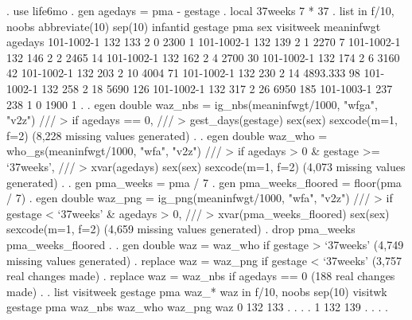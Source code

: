 . use life6mo
{\smallskip}
. gen agedays = pma - gestage
{\smallskip}
. local 37weeks 7 * 37
{\smallskip}
. list in f/10, noobs abbreviate(10) sep(10)
{\smallskip}
  {\TLC}
  {\VBAR}   infantid   gestage   pma   sex   visitweek   meaninfwgt   agedays {\VBAR}
  {\LFTT}
  {\VBAR} 101-1002-1       132   133     2           0         2300         1 {\VBAR}
  {\VBAR} 101-1002-1       132   139     2           1         2270         7 {\VBAR}
  {\VBAR} 101-1002-1       132   146     2           2         2465        14 {\VBAR}
  {\VBAR} 101-1002-1       132   162     2           4         2700        30 {\VBAR}
  {\VBAR} 101-1002-1       132   174     2           6         3160        42 {\VBAR}
  {\VBAR} 101-1002-1       132   203     2          10         4004        71 {\VBAR}
  {\VBAR} 101-1002-1       132   230     2          14     4893.333        98 {\VBAR}
  {\VBAR} 101-1002-1       132   258     2          18         5690       126 {\VBAR}
  {\VBAR} 101-1002-1       132   317     2          26         6950       185 {\VBAR}
  {\VBAR} 101-1003-1       237   238     1           0         1900         1 {\VBAR}
  {\BLC}
{\smallskip}
. 
. egen double waz_nbs = ig_nbs(meaninfwgt/1000, "wfga", "v2z") ///
>     if agedays == 0, ///
>     gest_days(gestage) sex(sex) sexcode(m=1, f=2)
(8,228 missing values generated)
{\smallskip}
. 
. egen double waz_who = who_gs(meaninfwgt/1000, "wfa", "v2z") ///
>     if agedays > 0 \& gestage >= `37weeks', ///
>     xvar(agedays) sex(sex) sexcode(m=1, f=2)
(4,073 missing values generated)
{\smallskip}
.         
. gen pma_weeks = pma / 7
{\smallskip}
. gen pma_weeks_floored = floor(pma / 7)
{\smallskip}
. egen double waz_png = ig_png(meaninfwgt/1000, "wfa", "v2z") ///
>     if gestage < `37weeks' \& agedays > 0, ///
>     xvar(pma_weeks_floored) sex(sex) sexcode(m=1, f=2)
(4,659 missing values generated)
{\smallskip}
. drop pma_weeks pma_weeks_floored
{\smallskip}
. 
. gen double waz = waz_who if gestage > `37weeks'
(4,749 missing values generated)
{\smallskip}
. replace waz = waz_png if gestage < `37weeks'
(3,757 real changes made)
{\smallskip}
. replace waz = waz_nbs if agedays == 0
(188 real changes made)
{\smallskip}
. 
. list visitweek gestage pma waz_* waz in f/10, noobs sep(10)
{\smallskip}
  {\TLC}
  {\VBAR} visitw{\tytilde}k   gestage   pma   waz_nbs   waz_who      waz_png          waz {\VBAR}
  {\LFTT}
  {\VBAR}        0       132   133         .         .            .            . {\VBAR}
  {\VBAR}        1       132   139         .         .            .            . {\VBAR}
